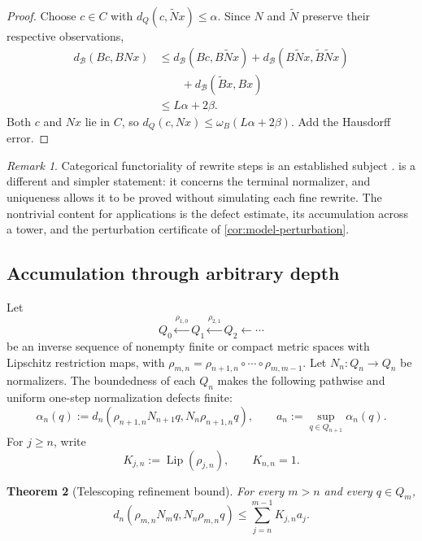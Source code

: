 \documentclass[11pt]{article}
\newtheorem{theorem}{Theorem}[section]
\theoremstyle{definition}
\theoremstyle{remark}
\newtheorem{remark}[theorem]{Remark}
\numberwithin{equation}{section}
\newcommand{\Lip}{\operatorname{Lip}}
\newcommand{\cB}{\mathcal B}
\begin{document}
\begin{proof}
Choose $c\in C$ with $d_Q(c,\widetilde Nx)\le\alpha$.  Since $N$ and $\widetilde N$ preserve their respective observations,
\begin{align*}
 d_{\cB}(Bc,BNx)
 &\le d_{\cB}(Bc,B\widetilde Nx)
      +d_{\cB}(B\widetilde Nx,\widetilde B\widetilde Nx)\\
 &\qquad+d_{\cB}(\widetilde Bx,Bx)\\
 &\le L\alpha+2\beta.
\end{align*}
Both $c$ and $Nx$ lie in $C$, so $d_Q(c,Nx)\le\omega_B(L\alpha+2\beta)$.  Add the Hausdorff error.
\end{proof}

\begin{remark}
Categorical functoriality of rewrite steps is an established subject \citep{DuvalEchahedProst2011}.   is a different and simpler statement: it concerns the terminal normalizer, and uniqueness allows it to be proved without simulating each fine rewrite.  The nontrivial content for applications is the defect estimate, its accumulation across a tower, and the perturbation certificate of \cref{cor:model-perturbation}.
\end{remark}

\subsection{Accumulation through arbitrary depth}

Let
\[
 Q_0\xleftarrow{\rho_{1,0}}Q_1
 \xleftarrow{\rho_{2,1}}Q_2\xleftarrow{}\cdots
\]
be an inverse sequence of nonempty finite or compact metric spaces with
Lipschitz restriction maps, with
$\rho_{m,n}=\rho_{n+1,n}\circ\cdots\circ\rho_{m,m-1}$.  Let
$N_n:Q_n\to Q_n$ be normalizers.  The boundedness of each $Q_n$ makes the
following pathwise and uniform one-step normalization defects finite:
\[
 \alpha_n(q)
 :=
 d_n(\rho_{n+1,n}N_{n+1}q,N_n\rho_{n+1,n}q),
 \qquad
 a_n:=\sup_{q\in Q_{n+1}}\alpha_n(q).
\]
For $j\ge n$, write
\[
 K_{j,n}:=\Lip(\rho_{j,n}),\qquad K_{n,n}=1.
\]

\begin{theorem}[Telescoping refinement bound]\label{thm:tower}
For every $m>n$ and every $q\in Q_m$,
\begin{equation}\label{eq:tower}
 d_n(\rho_{m,n}N_mq,N_n\rho_{m,n}q)
 \le
 \sum_{j=n}^{m-1}K_{j,n}a_j.
\end{equation}
\end{theorem}
\end{document}
